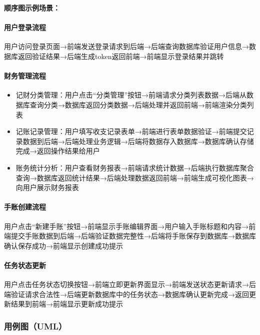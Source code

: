\documentclass[a4paper]{article}
\begin{document}
\textbf{顺序图示例场景：}

\paragraph{用户登录流程}
用户访问登录页面→前端发送登录请求到后端→后端查询数据库验证用户信息→数据库返回验证结果→后端生成token返回前端→前端显示登录结果并跳转

\paragraph{财务管理流程}
\begin{itemize}
    \item 记财分类管理：用户点击``分类管理''按钮→前端请求分类列表数据→后端从数据库查询分类→数据库返回分类数据→后端处理并返回前端→前端渲染分类列表
    \item 记账记录管理：用户填写收支记录表单→前端进行表单数据验证→前端提交记录数据到后端→后端处理业务逻辑→后端将数据存入数据库→数据库确认存储完成→返回操作结果给用户
    \item 账务统计分析：用户查看财务报表→前端请求统计数据→后端执行数据库聚合查询→数据库返回统计结果→后端处理数据返回前端→前端生成可视化图表→向用户展示财务报表
\end{itemize}

\paragraph{手账创建流程}
用户点击``新建手账''按钮→前端显示手账编辑界面→用户输入手账标题和内容→前端提交手账数据到后端→后端验证数据完整性→后端将手账保存到数据库→数据库确认保存成功→前端显示创建成功提示

\paragraph{任务状态更新}
用户点击任务状态切换按钮→前端立即更新界面显示→前端发送状态更新请求→后端验证请求合法性→后端更新数据库中的任务状态→数据库确认更新完成→返回更新结果到前端→前端显示更新成功提示

\subsubsection{用例图（UML）}
\end{document}
